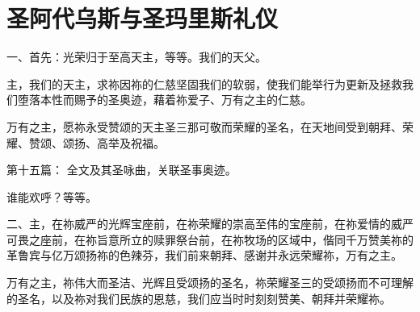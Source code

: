 
\chapter{圣阿代乌斯与圣玛里斯礼仪}


\par

一、首先：光荣归于至高天主，等等。我们的天父。\par

\par

主，我们的天主，求祢因祢的仁慈坚固我们的软弱，使我们能举行为更新及拯救我们堕落本性而赐予的圣奥迹，藉着祢爱子、万有之主的仁慈。\par

\par

万有之主，愿祢永受赞颂的天主圣三那可敬而荣耀的圣名，在天地间受到朝拜、荣耀、赞颂、颂扬、高举及祝福。\par

第十五篇： 全文及其圣咏曲，关联圣事奥迹。\par

\par

谁能欢呼？等等。\par

\par

二、主，在祢威严的光辉宝座前，在祢荣耀的崇高至伟的宝座前，在祢爱情的威严可畏之座前，在祢旨意所立的赎罪祭台前，在祢牧场的区域中，偕同千万赞美祢的革鲁宾与亿万颂扬祢的色辣芬，我们前来朝拜、感谢并永远荣耀祢，万有之主。\par

\par

万有之主，祢伟大而圣洁、光辉且受颂扬的圣名，祢荣耀圣三的受颂扬而不可理解的圣名，以及祢对我们民族的恩慈，我们应当时时刻刻赞美、朝拜并荣耀祢。\par

\par

